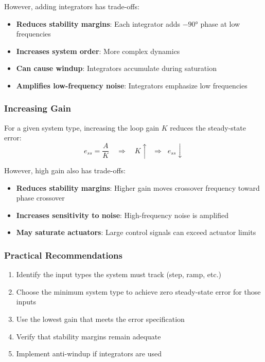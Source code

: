 However, adding integrators has trade-offs:
\begin{itemize}
    \item \textbf{Reduces stability margins}: Each integrator adds $-90°$ phase at low frequencies
    \item \textbf{Increases system order}: More complex dynamics
    \item \textbf{Can cause windup}: Integrators accumulate during saturation
    \item \textbf{Amplifies low-frequency noise}: Integrators emphasize low frequencies
\end{itemize}

\subsubsection{Increasing Gain}

For a given system type, increasing the loop gain $K$ reduces the steady-state error:
\begin{equation}
    e_{ss} = \frac{A}{K} \quad \Rightarrow \quad K \uparrow \;\; \Rightarrow \;\; e_{ss} \downarrow
\end{equation}

However, high gain also has trade-offs:
\begin{itemize}
    \item \textbf{Reduces stability margins}: Higher gain moves crossover frequency toward phase crossover
    \item \textbf{Increases sensitivity to noise}: High-frequency noise is amplified
    \item \textbf{May saturate actuators}: Large control signals can exceed actuator limits
\end{itemize}

\subsubsection{Practical Recommendations}

\begin{enumerate}
    \item Identify the input types the system must track (step, ramp, etc.)
    \item Choose the minimum system type to achieve zero steady-state error for those inputs
    \item Use the lowest gain that meets the error specification
    \item Verify that stability margins remain adequate
    \item Implement anti-windup if integrators are used
\end{enumerate}


